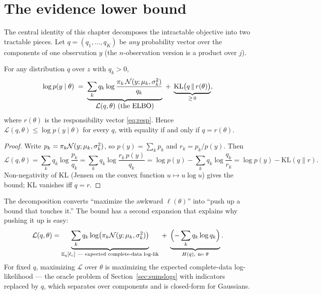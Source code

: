 \section{The evidence lower bound}\label{sec:elbo}

The central identity of this chapter decomposes the intractable objective
into two tractable pieces. Let $q = (q_1, \dots, q_K)$ be \emph{any}
probability vector over the components of one observation $y$ (the
$n$-observation version is a product over $j$).

\begin{proposition}\label{prop:elbo}
For any distribution $q$ over $z$ with $q_k > 0$,
\begin{equation}\label{eq:elbodecomp}
  \log p(y \mid \theta)
  \;=\;
  \underbrace{\sum_k q_k \log
  \frac{\pi_k\,\mathcal{N}(y; \mu_k, \sigma_k^2)}{q_k}}_{
    \textstyle \mathcal{L}(q, \theta)\ \text{(the ELBO)}}
  \;+\;
  \underbrace{\mathrm{KL}\bigl(q \,\|\, r(\theta)\bigr)}_{\ge\, 0},
\end{equation}
where $r(\theta)$ is the responsibility vector \eqref{eq:resp}. Hence
$\mathcal{L}(q,\theta) \le \log p(y \mid \theta)$ for every $q$, with
equality if and only if $q = r(\theta)$.
\end{proposition}

\begin{proof}
Write $p_k = \pi_k \mathcal{N}(y; \mu_k, \sigma_k^2)$, so
$p(y) = \sum_k p_k$ and $r_k = p_k / p(y)$. Then
\[
  \mathcal{L}(q, \theta)
  = \sum_k q_k \log \frac{p_k}{q_k}
  = \sum_k q_k \log \frac{r_k\, p(y)}{q_k}
  = \log p(y) - \sum_k q_k \log \frac{q_k}{r_k}
  = \log p(y) - \mathrm{KL}(q \| r).
\]
Non-negativity of KL (Jensen on the convex function $u \mapsto u\log u$)
gives the bound; KL vanishes iff $q = r$.
\end{proof}

The decomposition converts ``maximize the awkward $\ell(\theta)$'' into
``push up a bound that touches it.'' The bound has a second expansion that
explains why pushing it up is easy:
\begin{equation}\label{eq:elbo2}
  \mathcal{L}(q, \theta)
  = \underbrace{\sum_k q_k \log\bigl(\pi_k \mathcal{N}(y; \mu_k,
  \sigma_k^2)\bigr)}_{\mathbb{E}_q[\ell_c]\ \text{--- expected complete-data
  log-lik}}
  \;+\; \underbrace{\Bigl(-\sum_k q_k \log q_k\Bigr)}_{H(q),\
  \text{no}\ \theta}.
\end{equation}
For fixed $q$, maximizing $\mathcal{L}$ over $\theta$ is maximizing the
expected complete-data log-likelihood --- the oracle problem of
Section~\ref{sec:sumslogs} with indicators replaced by $q$, which
separates over components and is closed-form for Gaussians.


